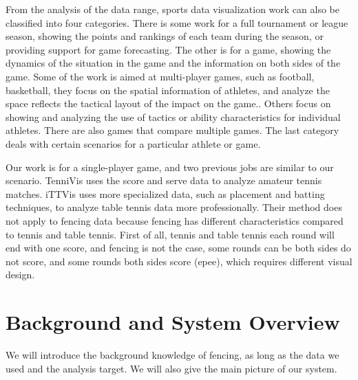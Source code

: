 \documentclass[journal]{vgtc}                %
\begin{document}
From the analysis of the data range, sports data visualization work can also be classified into four categories.
There is some work for a full tournament or league season, showing the points and rankings of each team during the season\cite{perin2016using}, or providing support for game forecasting\cite{vuillemot2016sports}.
The other is for a game, showing the dynamics of the situation in the game and the information on both sides of the game.
Some of the work is aimed at multi-player games, such as football, basketball, they focus on the spatial information of athletes, and analyze the space reflects the tactical layout of the impact on the game.\cite{sacha2014feature,perin2013soccerstories}.
Others focus on showing and analyzing the use of tactics or ability characteristics for individual athletes.\cite{polk2014tennivis,wu2018ittvis}
There are also games that compare multiple games. 
The last category deals with certain scenarios for a particular athlete or game.

Our work is for a single-player game, and two previous jobs are similar to our scenario.
TenniVis\cite{polk2014tennivis} uses the score and serve data to analyze amateur tennis matches.
iTTVis\cite{wu2018ittvis} uses more specialized data, such as placement and batting techniques, to analyze table tennis data more professionally.
Their method does not apply to fencing data because fencing has different characteristics compared to tennis and table tennis.
First of all, tennis and table tennis each round will end with one score, and fencing is not the case, some rounds can be both sides do not score, and some rounds both sides score (epee), which requires different visual design.




\section{Background and System Overview}
We will introduce the background knowledge of fencing, as long as the data we used and the analysis target. We will also give the main picture of our system.
\end{document}
